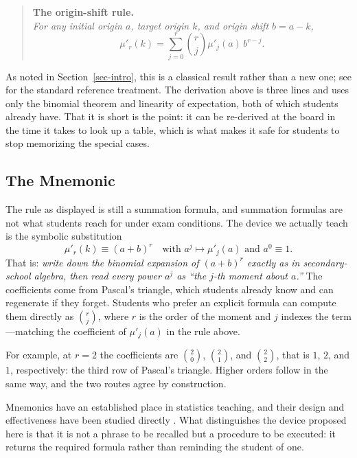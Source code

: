 \documentclass[
  12pt]{article}
\begin{document}
\begin{quote}
\textbf{The origin-shift rule.}\\
\emph{For any initial origin $a$, target origin $k$, and origin shift $b = a - k$,}
\[
\mu'_r(k) = \sum_{j=0}^r \binom{r}{j} \mu'_j(a) \, b^{r-j}.
\]
\end{quote}

As noted in Section~\ref{sec-intro}, this is a classical result rather than a new one; see \citet{kendall1977} for the standard reference treatment. The derivation above is three lines and uses only the binomial theorem and linearity of expectation, both of which students already have. That it is short is the point: it can be re-derived at the board in the time it takes to look up a table, which is what makes it safe for students to stop memorizing the special cases.

\subsection{The Mnemonic}

The rule as displayed is still a summation formula, and summation formulas are not what students reach for under exam conditions. The device we actually teach is the symbolic substitution
\[
\mu'_r(k) \equiv (a + b)^r \quad \text{with } a^j \mapsto \mu'_j(a) \text{ and } a^0 \equiv 1.
\]
That is: \emph{write down the binomial expansion of $(a+b)^r$ exactly as in secondary-school algebra, then read every power $a^j$ as ``the $j$-th moment about $a$.''} The coefficients come from Pascal's triangle, which students already know and can regenerate if they forget. Students who prefer an explicit formula can compute them directly as $\binom{r}{j}$, where $r$ is the order of the moment and $j$ indexes the term---matching the coefficient of $\mu'_j(a)$ in the rule above.

For example, at $r = 2$ the coefficients are $\binom{2}{0}$, $\binom{2}{1}$, and $\binom{2}{2}$, that is $1$, $2$, and $1$, respectively: the third row of Pascal's triangle. Higher orders follow in the same way, and the two routes agree by construction.

Mnemonics have an established place in statistics teaching, and their design and effectiveness have been studied directly \citep{lesser2011, hunt2010, mocko2017}. What distinguishes the device proposed here is that it is not a phrase to be recalled but a procedure to be executed: it returns the required formula rather than reminding the student of one.
\end{document}
